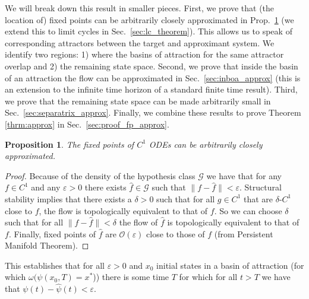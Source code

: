 \documentclass{article}
\newtheorem{proposition}{Proposition}
\theoremstyle{definition} \newtheorem{definition}{Definition}
\theoremstyle{remark} \newtheorem{remark}{Remark}
\newcounter{ct}
\begin{document}

We will break down this result in smaller pieces. 
First, we prove that (the location of) fixed points can be arbitrarily closely approximated in Prop.~\ref{prop:fp_approx} (we extend this to limit cycles in Sec.~\ref{sec:lc_theorem}).
This allows us to speak of corresponding attractors between the target and approximant system.
We identify two regions: 1) where the basins of attraction for the same attractor overlap and 2) the remaining state space.
Second, we prove that inside the basin of an attraction the flow can be approximated in Sec.~\ref{sec:inboa_approx} (this is an extension to the infinite time horizon of a standard finite time result). %
Third, we prove that the remaining state space can be made arbitrarily small in Sec.~\ref{sec:separatrix_approx}.
Finally, we combine these results to prove Theorem \ref{thrm:approx} in Sec.~\ref{sec:proof_fp_approx}.

\begin{proposition}\label{prop:fp_approx}
The fixed points of $C^1$ ODEs can be arbitrarily closely approximated. %
\end{proposition}

\begin{proof}
Because of the density of the hypothesis class $\mathcal{G}$ we have that for any $f\in C^1$ and any $\varepsilon>0$
there exists $\hat f\in\mathcal{G}$ such that $\|f-\hat f\|<\varepsilon$.
%
Structural stability implies that there exists a $\delta>0$ such that for all $g\in C^1$ that are $\delta$-$C^1$ close to $f$, the flow is topologically equivalent to that of $f$.
%
So we can choose $\delta$ such that for all $\|f-\hat f\|<\delta$ the flow of $\hat f$ is topologically equivalent to that of $f$.
Finally, fixed points of $\hat f$ are $\mathcal{O}(\varepsilon)$ close to those of $f$ (from Persistent Manifold Theorem\cite{jones1995gspt}).
\end{proof}

This establishes that for all $\varepsilon>0$ and $x_0$ initial states in a basin of attraction (for which $\omega (\psi(x_0,T) = x^*$)) there is some time $T$ for which for all $t>T$ we have that $\psi(t)-\hat \psi(t)<\varepsilon$.
\end{document}
